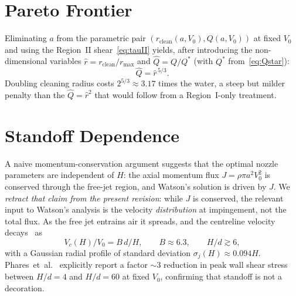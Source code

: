 \documentclass[aps,prfluids,reprint,amsmath,amssymb,floatfix]{revtex4-2}
\begin{document}
\section{Pareto Frontier}
\label{sec:pareto}

Eliminating $a$ from the parametric pair
$(r_\mathrm{clean}(a, V_0), Q(a, V_0))$ at fixed $V_0$ and using the
Region~II shear~\eqref{eq:tauII} yields, after introducing the
non-dimensional variables $\hat r = r_\mathrm{clean}/r_\mathrm{max}$ and
$\hat Q = Q/Q^*$ (with $Q^*$ from~\eqref{eq:Qstar}):
\begin{equation}
  \hat Q = \hat r^{\,5/3}.
  \label{eq:pareto}
\end{equation}
Doubling cleaning radius costs $2^{5/3} \approx 3.17$ times the water,
a steep but milder penalty than the $\hat Q = \hat r^2$ that would follow
from a Region~I-only treatment.

\section{Standoff Dependence}
\label{sec:standoff}

A naive momentum-conservation argument suggests that the optimal nozzle
parameters are independent of $H$: the axial momentum flux
$J = \rho \pi a^2 V_0^2$ is conserved through the free-jet region, and
Watson's solution is driven by $J$. We \emph{retract that claim from the
present revision}: while $J$ is conserved, the relevant input to Watson's
analysis is the velocity \emph{distribution} at impingement, not the
total flux. As the free jet entrains air it spreads, and the centreline
velocity decays~\citep{PopeBook} as
\begin{equation}
  V_c(H)/V_0 = B\,d/H, \qquad B \approx 6.3, \qquad H/d \gtrsim 6,
  \label{eq:Vcjet}
\end{equation}
with a Gaussian radial profile of standard deviation $\sigma_j(H) \approx 0.094 H$.
Phares~et~al.~\citep{Phares2000} explicitly report a factor $\sim 3$
reduction in peak wall shear stress between $H/d = 4$ and $H/d = 60$ at
fixed $V_0$, confirming that standoff is not a decoration.
\end{document}
